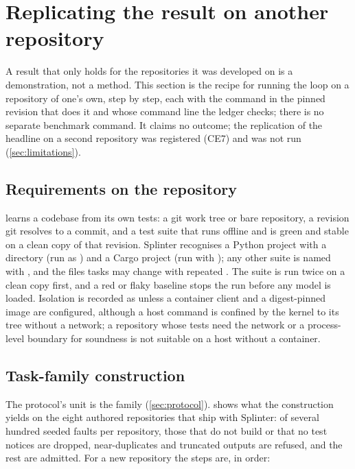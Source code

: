
\section{Replicating the result on another repository}\label{sec:replicate}

A result that only holds for the repositories it was developed on is a demonstration, not a
method. This section is the recipe for running the loop on a repository of one's own, step by
step, each with the command in the pinned revision that does it and whose command line the ledger
checks; there is no separate benchmark command. It claims no outcome; the replication of the headline on a
second repository was registered (CE7) and was not run (\cref{sec:limitations}).

\subsection{Requirements on the repository}

 learns a codebase from its own tests: a git work tree or bare
repository, a revision git resolves to a commit, and a test suite that runs offline and is
green and stable on a clean copy of that revision. Splinter recognises a Python project with
a  directory (run as ) and a Cargo project (run with
); any other suite is named with , and the files
tasks may change with repeated . The suite is run twice on a clean
copy first, and a red or flaky baseline stops the run before any model is loaded.
Isolation is recorded as  unless a container client and a digest-pinned image are
configured, although a host command is confined by the kernel to its tree without a network;
a repository whose tests need the network or a process-level boundary for soundness is not
suitable on a host without a container.

\subsection{Task-family construction}

The protocol's unit is the family (\cref{sec:protocol}).  shows what the
construction yields on the eight authored repositories that ship with Splinter: of several
hundred seeded faults per repository, those that do not build or that no test notices are
dropped, near-duplicates and truncated outputs are refused, and the rest are admitted.
For a new repository the steps are, in order:

